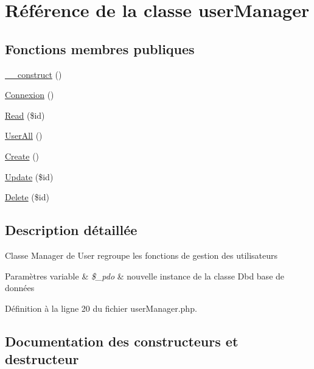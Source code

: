 \hypertarget{class_src_1_1_managers_1_1user_manager}{}\section{Référence de la classe user\+Manager}
\label{class_src_1_1_managers_1_1user_manager}
\subsection*{Fonctions membres publiques}
\begin{DoxyCompactItemize}
\item 
\hyperlink{class_src_1_1_managers_1_1user_manager_a095c5d389db211932136b53f25f39685}{\+\_\+\+\_\+construct} ()
\item 
\hyperlink{class_src_1_1_managers_1_1user_manager_a00fdd5c0ca353b468ea33fb246c28d90}{Connexion} ()
\item 
\hyperlink{class_src_1_1_managers_1_1user_manager_ad2bbc9b3130abdfe3a9fc9e9fe36716f}{Read} (\$id)
\item 
\hyperlink{class_src_1_1_managers_1_1user_manager_a0a377befd1052a5f989fd915af31373b}{User\+All} ()
\item 
\hyperlink{class_src_1_1_managers_1_1user_manager_ad01f71fa0ecc039494e3c282864298c3}{Create} ()
\item 
\hyperlink{class_src_1_1_managers_1_1user_manager_a82232b33fbfacdbdb8a8f49acaecf564}{Update} (\$id)
\item 
\hyperlink{class_src_1_1_managers_1_1user_manager_a59113b5ecd1d155db6a4f30af34a1e80}{Delete} (\$id)
\end{DoxyCompactItemize}


\subsection{Description détaillée}
Classe Manager de User regroupe les fonctions de gestion des utilisateurs 
\begin{DoxyParams}[1]{Paramètres}
variable & {\em \$\+\_\+pdo} & nouvelle instance de la classe Dbd base de données \\
\hline
\end{DoxyParams}


Définition à la ligne 20 du fichier user\+Manager.\+php.



\subsection{Documentation des constructeurs et destructeur}
\mbox{\label{class_src_1_1_managers_1_1user_manager_a095c5d389db211932136b53f25f39685}} 
